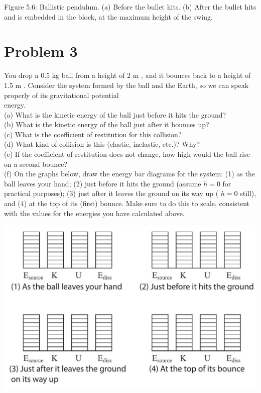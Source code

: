 \documentclass[10pt]{article}
\begin{document}
Figure 5.6: Ballistic pendulum. (a) Before the bullet hits. (b) After the bullet hits and is embedded in the block, at the maximum height of the swing.

\section*{Problem 3}
You drop a 0.5 kg ball from a height of 2 m , and it bounces back to a height of 1.5 m . Consider the system formed by the ball and the Earth, so we can speak properly of its gravitational potential\\
energy.\\
(a) What is the kinetic energy of the ball just before it hits the ground?\\
(b) What is the kinetic energy of the ball just after it bounces up?\\
(c) What is the coefficient of restitution for this collision?\\
(d) What kind of collision is this (elastic, inelastic, etc.)? Why?\\
(e) If the coefficient of restitution does not change, how high would the ball rise on a second bounce?\\
(f) On the graphs below, draw the energy bar diagrams for the system: (1) as the ball leaves your hand; (2) just before it hits the ground (assume $h=0$ for practical purposes); (3) just after it leaves the ground on its way up ( $h=0$ still), and (4) at the top of its (first) bounce. Make sure to do this to scale, consistent with the values for the energies you have calculated above.

\begin{center}
\includegraphics[max width=\textwidth]{2024_09_14_9969b06773f10b6936e8g-128}
\end{center}
\end{document}

